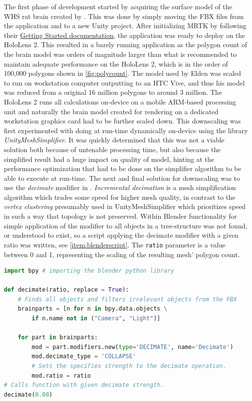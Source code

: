 The first phase of development started by acquiring the surface model of the WHS rat brain created by \citet{Elden2017}. This was done by simply moving the FBX files from the  application and to a new Unity project. After initializing MRTK by following their \href{https://microsoft.github.io/MixedRealityToolkit-Unity/version/releases/2.2.0/Documentation/GettingStartedWithTheMRTK.html}{Getting Started documentation}, the application was ready to deploy on the HoloLens 2. This resulted in a barely running application as the polygon count of the brain model was orders of magnitude larger than what is recommended to maintain adequate performance on the HoloLens 2, which is in the order of 100,000 polygons shown in \autoref{fig:polycount}. The model used by Elden was scaled to run on workstation computer outputting to an HTC Vive, and thus his model was reduced from a original 16 million polygons to around 3 million. The HoloLens 2 runs all calculations on-device on a mobile ARM-based processing unit and naturally the brain model created for rendering on a dedicated workstation graphics card had to be further scaled down. 
This downscaling was first experimented with doing at run-time dynamically on-device using the library \textit{UnityMeshSimplifier}. It was quickly determined that this was not a viable solution both because of untenable processing time, but also because the simplified result had a huge impact on quality of model, hinting at the performance optimization that had to be done on the simplifier algorithm to be able to execute at run-time. The next and final solution for downscaling was to use the \textit{decimate} modifier in . \textit{Incremental decimation} is a mesh simplification algorithm which trades some speed for higher mesh quality, in contrast to the \textit{vertex clustering} presumably used in UnityMeshSimplifier which prioritizes speed in such a way that topology is not preserved. Within Blender functionality for simple application of the modifier to all objects in a tree-structure was not found, or understood to exist, so a script applying the decimate modifier with a given ratio was written, see \autoref{item:blenderscript}. The \texttt{ratio} parameter is a value between 0 and 1, representing the scaling of the resulting mesh' polygon count.

\begin{lstlisting}[language=python, label={item:blenderscript}, caption={Blender script applying a decimate modifier to all relevant objects in a scene.}]
import bpy # importing the blender python library

def decimate(ratio, replace = True):
    # Finds all objects and filters irrelevant objects from the FBX 
    brainparts = [n for n in bpy.data.objects \
        if n.name not in ("Camera", "Light")] 

    for part in brainparts:
        mod = part.modifiers.new(type='DECIMATE', name='Decimate')
        mod.decimate_type = 'COLLAPSE'
        # Sets the specifies strength to the decimate operation. 
        mod.ratio = ratio
# Calls function with given decimate strength.
decimate(0.08)
\end{lstlisting}

